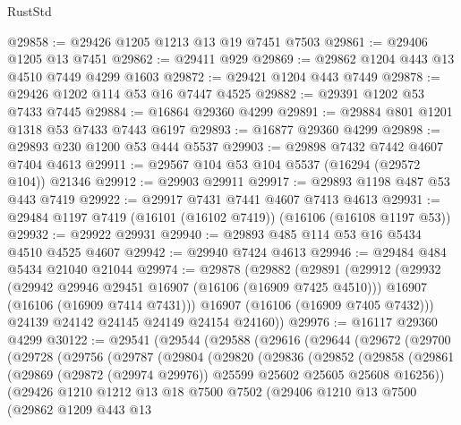 \begin{lexlean}{RustStd}
\begin{coremodule}
@29858 := @29426 @1205 @1213 @13 @19 @7451 @7503
@29861 := @29406 @1205 @13 @7451
@29862 := @29411 @929
@29869 := @29862 @1204 @443 @13 @4510 @7449 @4299 @1603
@29872 := @29421 @1204 @443 @7449
@29878 := @29426 @1202 @114 @53 @16 @7447 @4525
@29882 := @29391 @1202 @53 @7433 @7445
@29884 := @16864 @29360 @4299
@29891 := @29884 @801 @1201 @1318 @53 @7433 @7443 @6197
@29893 := @16877 @29360 @4299
@29898 := @29893 @230 @1200 @53 @444 @5537
@29903 := @29898 @7432 @7442 @4607 @7404 @4613
@29911 := @29567 @104 @53 @104 @5537 (@16294 (@29572 @104)) @21346
@29912 := @29903 @29911
@29917 := @29893 @1198 @487 @53 @443 @7419
@29922 := @29917 @7431 @7441 @4607 @7413 @4613
@29931 := @29484 @1197 @7419 (@16101 (@16102 @7419)) (@16106 (@16108 @1197 @53))
@29932 := @29922 @29931
@29940 := @29893 @485 @114 @53 @16 @5434 @4510 @4525 @4607
@29942 := @29940 @7424 @4613
@29946 := @29484 @484 @5434 @21040 @21044
@29974 := @29878
    (@29882
      (@29891
        (@29912
          (@29932
            (@29942 @29946 @29451 @16907 (@16106 (@16909 @7425 @4510)))
            @16907
            (@16106 (@16909 @7414 @7431)))
          @16907
          (@16106 (@16909 @7405 @7432)))
        @24139
        @24142
        @24145
        @24149
        @24154
        @24160))
@29976 := @16117 @29360 @4299
@30122 := @29541
    (@29544
      (@29588
        (@29616
          (@29644
            (@29672
              (@29700
                (@29728
                  (@29756
                    (@29787
                      (@29804
                        (@29820
                          (@29836
                            (@29852
                              (@29858
                                (@29861
                                  (@29869
                                    (@29872 (@29974 @29976))
                                    @25599
                                    @25602
                                    @25605
                                    @25608
                                    @16256))
                                (@29426
                                  @1210
                                  @1212
                                  @13
                                  @18
                                  @7500
                                  @7502
                                  (@29406
                                    @1210
                                    @13
                                    @7500
                                    (@29862
                                      @1209
                                      @443
                                      @13

\end{coremodule}
\end{lexlean}
